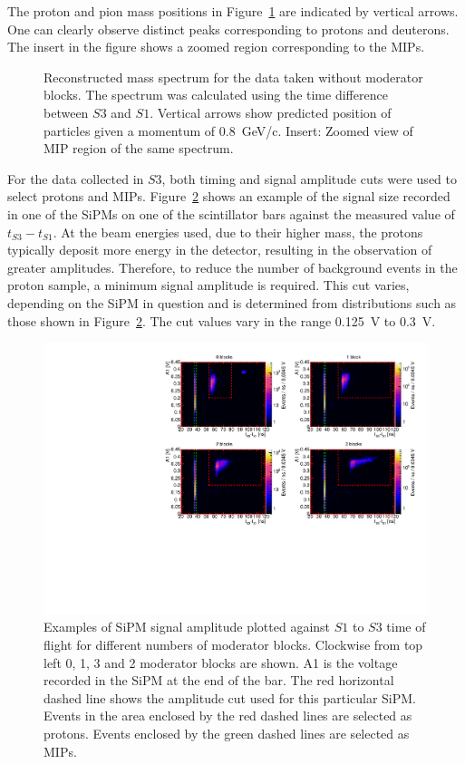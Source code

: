The proton and pion mass positions in Figure~\ref{fig:s3tof_mass} are indicated by vertical arrows.
One can clearly observe distinct peaks corresponding to protons and deuterons. 
The insert in the figure shows a zoomed region corresponding to the MIPs. 

\begin{figure}[ht]
  \begin{adjustbox}{max totalsize={\linewidth}, center}
    
  \end{adjustbox}
  \caption{Reconstructed mass spectrum for the data taken without moderator blocks. The spectrum was calculated using the time difference between $\mathit{S3}$ and $\mathit{S1}$. Vertical arrows show predicted position of particles given a momentum of 0.8~GeV/c. Insert: Zoomed view of MIP region of the same spectrum.}
  \label{fig:s3tof_mass}
\end{figure}

For the data collected in $\mathit{S3}$, both timing and signal amplitude cuts were used to select protons and MIPs.
Figure~\ref{fig:TvsA} shows an example of the signal size recorded in one of the SiPMs on one of the scintillator bars against the measured value of $t_{\mathit{S3}} - t_{\mathit{S1}}$.
At the beam energies used, due to their higher mass, the protons typically deposit more energy in the detector, resulting in the observation of greater amplitudes.
Therefore, to reduce the number of background events in the proton sample, a minimum signal amplitude is required.
This cut varies, depending on the SiPM in question and is determined from distributions such as those shown in Figure~\ref{fig:TvsA}. 
The cut values vary in the range 0.125~V to 0.3~V.

\begin{figure}[h]
  \centering
  \includegraphics[width=.9\linewidth]{files/Figures/tvsa.pdf}
  \caption{Examples of SiPM signal amplitude plotted against $\mathit{S1}$ to $\mathit{S3}$ time of flight for different numbers of moderator blocks. Clockwise from top left 0, 1, 3 and 2 moderator blocks are shown. A1 is the voltage recorded in the SiPM at the end of the bar. The red horizontal dashed line shows the amplitude cut used for this particular SiPM. Events in the area enclosed by the red dashed lines are selected as protons. Events enclosed by the green dashed lines are selected as MIPs.}
  \label{fig:TvsA}
\end{figure}

